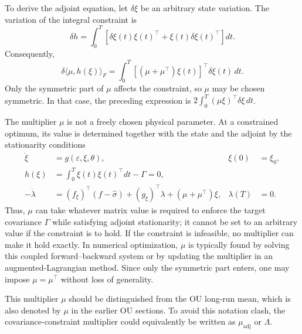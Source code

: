 \documentclass[11pt]{article}
\begin{document}
To derive the adjoint equation, let $\delta\xi$ be an arbitrary state
variation. The variation of the integral constraint is
\begin{equation}
    \delta h
    =\int_0^T\left[\delta\xi(t)\xi(t)^\top
        +\xi(t)\delta\xi(t)^\top\right]dt.
\end{equation}
Consequently,
\begin{equation}
    \delta\langle\mu,h(\xi)\rangle_F
    =\int_0^T\left[(\mu+\mu^\top)\xi(t)\right]^\top
    \delta\xi(t)\,dt.
\end{equation}
Only the symmetric part of $\mu$ affects the constraint, so $\mu$ may be
chosen symmetric. In that case, the preceding expression is
$2\int_0^T(\mu\xi)^\top\delta\xi\,dt$.

The multiplier $\mu$ is not a freely chosen physical parameter. At a
constrained optimum, its value is determined together with the state and the
adjoint by the stationarity conditions
\begin{align}
    \dot{\xi} & = g(\varepsilon,\xi,\theta),
              & \xi(0)                                   & = \xi_0, \\
    h(\xi)    & = \int_0^T\xi(t)\xi(t)^\top dt-\Gamma=0,            \\
    -\dot{\lambda}
              & = (f_\xi)^\top(f-\widehat{\sigma})
    +(g_\xi)^\top\lambda+(\mu+\mu^\top)\xi,
              & \lambda(T)                               & = 0.
\end{align}
Thus, $\mu$ can take whatever matrix value is required to enforce the target
covariance $\Gamma$ while satisfying adjoint stationarity; it cannot be set to
an arbitrary value if the constraint is to hold. If the constraint is
infeasible, no multiplier can make it hold exactly. In numerical optimization,
$\mu$ is typically found by solving this coupled forward--backward system or
by updating the multiplier in an augmented-Lagrangian method. Since only the
symmetric part enters, one may impose $\mu=\mu^\top$ without loss of
generality.

This multiplier $\mu$ should be distinguished from the OU long-run mean,
which is also denoted by $\mu$ in the earlier OU sections. To avoid this
notation clash, the covariance-constraint multiplier could equivalently be
written as $\mu_{\mathrm{adj}}$ or $\Lambda$.
\end{document}
